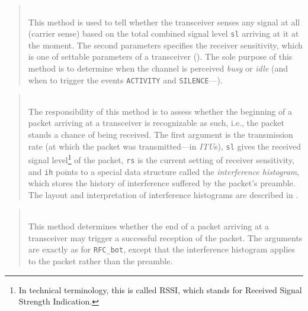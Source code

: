 \begin{quote}
\noindent{} \hspace{0in}\vspace{0.05in}\\
\noindent
This method is used to tell whether the transceiver senses any signal at
all (carrier sense)
based on the total combined signal level {\tt sl} arriving at it at the moment.
The second parameters specifies the receiver sensitivity, which is one of
settable parameters of a transceiver ().
The sole purpose of this method is to determine when the channel is perceived
{\em busy\/} or {\em idle\/} (and when to trigger the events {\tt ACTIVITY} and
{\tt SILENCE}---).
\end{quote}

\begin{quote}
\noindent{} \hspace{0in}\vspace{0.05in}\\
\noindent
The responsibility of
this method is to assess whether the beginning of a packet arriving at a
transceiver is recognizable as such, i.e., the packet stands a chance of
being received.
The first argument is the transmission rate (at which the packet was
transmitted---in {\em ITU\/}s), {\tt sl} gives the received signal
level\footnote{In technical terminology, this is called RSSI, which
stands for Received Signal Strength Indication.}
of the packet, {\tt rs} is the current setting of receiver sensitivity,
and {\tt ih} points to a special data structure called the {\em interference
histogram}, which stores the history of interference
suffered by the packet's preamble.
The layout and interpretation of interference histograms are described in
.
\end{quote}

\begin{quote}
\noindent{} \hspace{0in}\vspace{0.05in}\\
\noindent
This method determines whether the end of a packet arriving at a transceiver
may trigger a successful reception of the packet.
The arguments are exactly as for {\tt RFC\_bot}, except that the
interference histogram applies to the packet rather than the preamble.
\end{quote}

